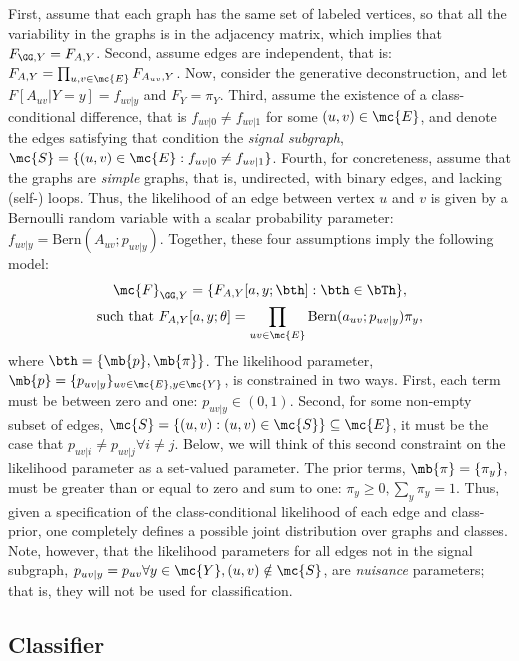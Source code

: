 \documentclass[10pt,journal,cspaper,compsoc]{IEEEtran}
\begin{document}
First,  assume that each graph has the same set of labeled vertices, so that all the variability in the graphs is in the adjacency matrix, which implies that $F_{\GG,Y}=F_{A,Y}$. Second, assume edges are independent, that is: $F_{A,Y}=\prod_{u,v \in \mc{E}} F_{A_{uv},Y}$.  Now, consider the generative deconstruction, and let $F[A_{uv} | Y=y]=f_{uv|y}$ and $F_Y=\pi_Y$.  Third, assume the existence of a class-conditional difference, that is $f_{uv|0} \neq f_{uv|1}$ for some $(u,v) \in \mc{E}$, and denote the edges satisfying that condition  the \emph{signal subgraph}, $\mc{S}=\{(u,v) \in \mc{E}: f_{uv|0} \neq f_{uv|1}\}$.  Fourth, for concreteness, assume that the graphs are \emph{simple} graphs, that is, undirected, with binary edges, and lacking (self-) loops.  Thus, the likelihood of an edge between vertex $u$ and $v$ is given by a Bernoulli random variable with a scalar probability parameter:  $f_{uv|y}=\text{Bern}(A_{uv}; p_{uv|y})$. Together, these four assumptions imply the following model: 
\begin{multline}
\mc{F}_{\GG,Y}=\{F_{A, Y}[a,y; \bth]:   \bth \in \bTh\}, 
\\ \text{such that } F_{A,Y}[a,y; \theta]  =\prod_{uv \in \mc{E}} \text{Bern}(a_{uv}; p_{uv|y}) \pi_y,
\end{multline}
where $\bth=\{\mb{p},\mb{\pi}\}$. The likelihood parameter, $\mb{p}=\{p_{uv|y}\}_{uv \in \mc{E}, y \in \mc{Y}}$, is constrained in two ways.  First, each term must be between zero and one: $p_{uv|y} \in (0,1)$.  Second, for some non-empty subset of edges, $\mc{S}=\{(u,v) : (u,v) \in \mc{S}\} \subseteq \mc{E}$, it must be the case that $ p_{uv|i}\neq p_{uv|j}  \forall i \neq j$.  Below, we will think of this second constraint on the likelihood parameter as a set-valued parameter. The prior terms, $\mb{\pi}=\{\pi_y\}$, must be greater than or equal to zero and sum to one: $\pi_y \geq 0, \sum_y \pi_y=1$.  Thus, given a specification of the class-conditional likelihood of each edge and class-prior, one completely defines a possible joint distribution over graphs and classes. Note, however, that the likelihood parameters for all edges not in the signal subgraph, $p_{uv|y}=p_{uv} \forall y \in \mc{Y}, (u,v) \notin \mc{S}$,  are \emph{nuisance} parameters; that is, they will not be used for classification.



\subsection{Classifier} %
\label{sub:classifier}
\end{document}
